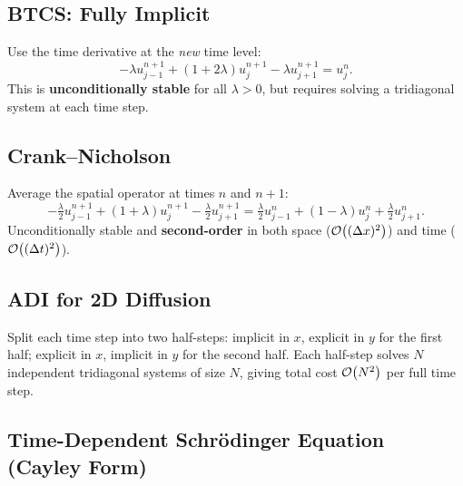 \subsection{BTCS: Fully Implicit}\label{subsec:lec17:btcs}

Use the time derivative at the \emph{new} time level:
\begin{equation}
  -\lambda u_{j-1}^{n+1} + (1+2\lambda)u_j^{n+1}
  - \lambda u_{j+1}^{n+1} = u_j^n.
  \label{eq:lec17:btcs}
\end{equation}
This is \textbf{unconditionally stable} for all $\lambda>0$, but
requires solving a tridiagonal system at each time step.

\subsection{Crank--Nicholson}\label{subsec:lec17:cn}

Average the spatial operator at times $n$ and $n+1$:
\begin{equation}
  -\tfrac{\lambda}{2}u_{j-1}^{n+1} + (1+\lambda)u_j^{n+1}
  - \tfrac{\lambda}{2}u_{j+1}^{n+1}
  = \tfrac{\lambda}{2}u_{j-1}^n + (1-\lambda)u_j^n
    + \tfrac{\lambda}{2}u_{j+1}^n.
  \label{eq:lec17:cn}
\end{equation}
Unconditionally stable and \textbf{second-order} in both space
($\mathcal{O}\!\left((\Delta x)^2\right)$) and time ($\mathcal{O}\!\left((\Delta t)^2\right)$).

\subsection{ADI for 2D Diffusion}\label{subsec:lec17:adi}

Split each time step into two half-steps:
implicit in $x$, explicit in $y$ for the first half;
explicit in $x$, implicit in $y$ for the second half.
Each half-step solves $N$ independent tridiagonal systems of size $N$,
giving total cost $\mathcal{O}\!\left(N^2\right)$ per full time step.

\subsection{Time-Dependent Schrödinger Equation (Cayley Form)}\label{subsec:lec17:tdse}

